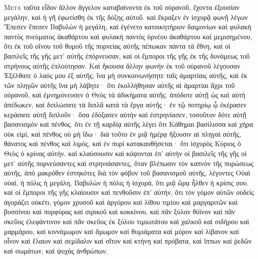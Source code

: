 \begin{pages}
    \begin{Rightside}
        \beginnumbering
		\renewcommand{\LettrineFontHook}{\PHtitl}
		\lettrine[lines=3]{Μ}{ετὰ} ταῦτα εἶδον ἄλλον ἄγγελον καταβαίνοντα ἐκ τοῦ οὐρανοῦ, ἔχοντα ἐξουσίαν μεγάλην, καὶ ἡ γῆ ἐφωτίσθη ἐκ τῆς δόξης αὐτοῦ. καὶ ἔκραξεν ἐν ἰσχυρᾷ φωνῇ λέγων Ἔπεσεν ἔπεσεν Βαβυλὼν ἡ μεγάλη, καὶ ἐγένετο κατοικητήριον δαιμονίων καὶ φυλακὴ παντὸς πνεύματος ἀκαθάρτου καὶ φυλακὴ παντὸς ὀρνέου ἀκαθάρτου καὶ μεμισημένου, ὅτι ἐκ τοῦ οἴνου τοῦ θυμοῦ τῆς πορνείας αὐτῆς πέπωκαν πάντα τὰ ἔθνη, καὶ οἱ βασιλεῖς τῆς γῆς μετ’ αὐτῆς ἐπόρνευσαν, καὶ οἱ ἔμποροι τῆς γῆς ἐκ τῆς δυνάμεως τοῦ στρήνους αὐτῆς ἐπλούτησαν. 
		\pend
		\pstart
		Καὶ ἤκουσα ἄλλην φωνὴν ἐκ τοῦ οὐρανοῦ λέγουσαν Ἐξέλθατε ὁ λαός μου ἐξ αὐτῆς, ἵνα μὴ συνκοινωνήσητε ταῖς ἁμαρτίαις αὐτῆς, καὶ ἐκ τῶν πληγῶν αὐτῆς ἵνα μὴ λάβητε· ὅτι ἐκολλήθησαν αὐτῆς αἱ ἁμαρτίαι ἄχρι τοῦ οὐρανοῦ, καὶ ἐμνημόνευσεν ὁ Θεὸς τὰ ἀδικήματα αὐτῆς. ἀπόδοτε αὐτῇ ὡς καὶ αὐτὴ ἀπέδωκεν, καὶ διπλώσατε τὰ διπλᾶ κατὰ τὰ ἔργα αὐτῆς· ἐν τῷ ποτηρίῳ ᾧ ἐκέρασεν κεράσατε αὐτῇ διπλοῦν· 
		\pend
		\pstart
		ὅσα ἐδόξασεν αὐτὴν καὶ ἐστρηνίασεν, τοσοῦτον δότε αὐτῇ βασανισμὸν καὶ πένθος. ὅτι ἐν τῇ καρδίᾳ αὐτῆς λέγει ὅτι Κάθημαι βασίλισσα καὶ χήρα οὐκ εἰμί, καὶ πένθος οὐ μὴ ἴδω· διὰ τοῦτο ἐν μιᾷ ἡμέρᾳ ἥξουσιν αἱ πληγαὶ αὐτῆς, θάνατος καὶ πένθος καὶ λιμός, καὶ ἐν πυρὶ κατακαυθήσεται· ὅτι ἰσχυρὸς Κύριος ὁ Θεὸς ὁ κρίνας αὐτήν. 
		\pend
		\pstart
		καὶ κλαύσουσιν καὶ κόψονται ἐπ’ αὐτὴν οἱ βασιλεῖς τῆς γῆς οἱ μετ’ αὐτῆς πορνεύσαντες καὶ στρηνιάσαντες, ὅταν βλέπωσιν τὸν καπνὸν τῆς πυρώσεως αὐτῆς, ἀπὸ μακρόθεν ἑστηκότες διὰ τὸν φόβον τοῦ βασανισμοῦ αὐτῆς, λέγοντες Οὐαὶ οὐαί, ἡ πόλις ἡ μεγάλη, Βαβυλὼν ἡ πόλις ἡ ἰσχυρά, ὅτι μιᾷ ὥρᾳ ἦλθεν ἡ κρίσις σου. 
		\pend
		\pstart
		καὶ οἱ ἔμποροι τῆς γῆς κλαίουσιν καὶ πενθοῦσιν ἐπ’ αὐτήν, ὅτι τὸν γόμον αὐτῶν οὐδεὶς ἀγοράζει οὐκέτι, γόμον χρυσοῦ καὶ ἀργύρου καὶ λίθου τιμίου καὶ μαργαριτῶν καὶ βυσσίνου καὶ πορφύρας καὶ σιρικοῦ καὶ κοκκίνου, καὶ πᾶν ξύλον θύϊνον καὶ πᾶν σκεῦος ἐλεφάντινον καὶ πᾶν σκεῦος ἐκ ξύλου τιμιωτάτου καὶ χαλκοῦ καὶ σιδήρου καὶ μαρμάρου, καὶ κιννάμωμον καὶ ἄμωμον καὶ θυμιάματα καὶ μύρον καὶ λίβανον καὶ οἶνον καὶ ἔλαιον καὶ σεμίδαλιν καὶ σῖτον καὶ κτήνη καὶ πρόβατα, καὶ ἵππων καὶ ῥεδῶν καὶ σωμάτων, καὶ ψυχὰς ἀνθρώπων. 

\end{Rightside}
\end{pages}
